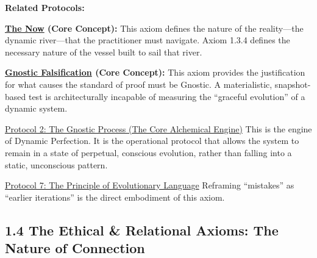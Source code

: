 \documentclass{article}
\begin{document}
\begin{nobullet}
    \item \textbf{Related Protocols:}
        \begin{nobullet}
            \item \textbf{\hyperlink{gloss:the_now}{The Now} (Core Concept):} This axiom defines the nature of the reality—the dynamic river—that the practitioner must navigate. Axiom 1.3.4 defines the necessary nature of the vessel built to sail that river.
            \item \textbf{\hyperlink{gloss:gnostic_falsification}{Gnostic Falsification} (Core Concept):} This axiom provides the justification for what causes the standard of proof must be Gnostic. A materialistic, snapshot-based test is architecturally incapable of measuring the ``graceful evolution'' of a dynamic system.
            \item \hyperref[protocol_2_the_gnostic_process_the_core_alchemical_engine]{Protocol 2: The Gnostic Process (The Core Alchemical Engine)} This is the engine of Dynamic Perfection. It is the operational protocol that allows the system to remain in a state of perpetual, conscious evolution, rather than falling into a static, unconscious pattern.
            \item \hyperref[protocol_7_the_principle_of_evolutionary_language]{Protocol 7: The Principle of Evolutionary Language} Reframing ``mistakes'' as ``earlier iterations'' is the direct embodiment of this axiom.
        \end{nobullet}
\end{nobullet}

\subsection*{1.4 The Ethical \& Relational Axioms: The Nature of Connection}
\end{document}
